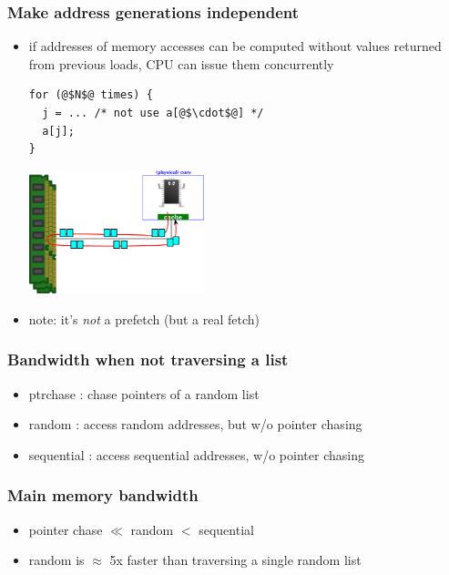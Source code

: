 \documentclass[12pt,dvipdfmx]{beamer}
\newcommand{\ao}[1]{{\color{blue}#1}}
\begin{document}
\begin{frame}[fragile]
\frametitle{Make address generations independent}
\begin{itemize}

\item if addresses of memory accesses can be
  computed without values returned from
  previous loads, CPU can issue them concurrently

\begin{lstlisting}
for (@$N$@ times) {
  j = ... /* not use a[@$\cdot$@] */
  a[j];
}
\end{lstlisting}

\begin{center}
\includegraphics[width=0.4\textwidth]{out/pdf/svg/latency_very_large_2.pdf}
\end{center}

\item note: it's \ao{\emph{not}} a prefetch (but a real fetch)
\end{itemize}
\end{frame}


\begin{frame}[fragile]
\frametitle{Bandwidth when not traversing a list}
\begin{itemize}
\item ptrchase : chase pointers of a random list
\item random : access random addresses, but w/o pointer chasing
\item sequential : access sequential addresses, w/o pointer chasing
\end{itemize}
\begin{center}
  {\scriptsize}
\end{center}
\end{frame}

\begin{frame}[fragile]
\frametitle{Main memory bandwidth}
\begin{itemize}
\item pointer chase $\ll$ random $<$ sequential
\item random is $\approx$ 5x faster than traversing a single random list
\begin{center}
  {\scriptsize}
\end{center}
\end{itemize}
\end{frame}
\end{document}
